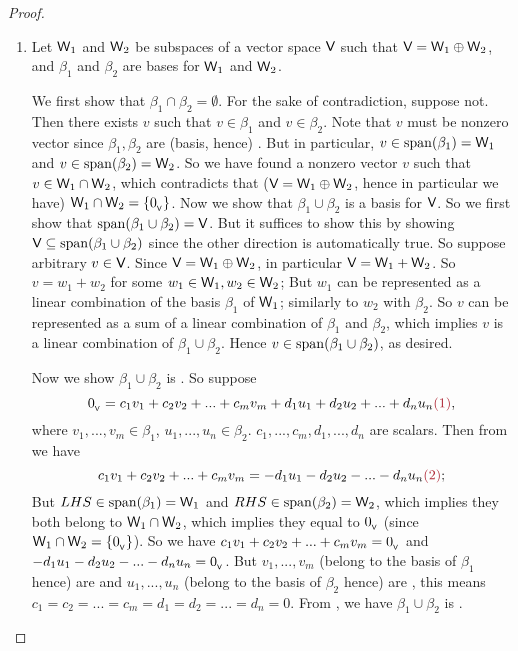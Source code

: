 \begin{proof} \ 
\begin{enumerate}
\item
Let \(\textsf{W}_1\) and \(\textsf{W}_2\) be subspaces of a vector space \(\textsf{V}\) such that \(\textsf{V} = \textsf{W}_1 \oplus \textsf{W}_2\), and \(\beta_1\) and \(\beta_2\) are bases for \(\textsf{W}_1\) and \(\textsf{W}_2\).

We first show that \(\beta_1 \cap \beta_2 = \emptyset\).
For the sake of contradiction, suppose not.
Then there exists \(v\) such that \(v \in \beta_1\) and \(v \in \beta_2\).
Note that \(v\) must be nonzero vector since \(\beta_1, \beta_2\) are (basis, hence) \LID{}.
But in particular, \(v \in \operatorname{span}(\beta_1) = \textsf{W}_1\) and \(v \in \operatorname{span}(\beta_2) = \textsf{W}_2\).
So we have found a nonzero vector \(v\) such that \(v \in \textsf{W}_1 \cap \textsf{W}_2\), which contradicts that (\(\textsf{V} = \textsf{W}_1 \oplus \textsf{W}_2\), hence in particular we have) \(\textsf{W}_1 \cap \textsf{W}_2 = \{ 0_{_{\textsf{V}}} \}\).
Now we show that \(\beta_1 \cup \beta_2\) is a basis for \(\textsf{V}\).
So we first show that \(\operatorname{span}(\beta_1 \cup \beta_2) = \textsf{V}\).
But it suffices to show this by showing \(\textsf{V} \subseteq \operatorname{span}(\beta_1 \cup \beta_2)\) since the other direction is automatically true.
So suppose arbitrary \(v \in \textsf{V}\).
Since \(\textsf{V} = \textsf{W}_1 \oplus \textsf{W}_2\), in particular \(\textsf{V} = \textsf{W}_1 + \textsf{W}_2\).
So \(v = w_1 + w_2\) for some \(w_1 \in \textsf{W}_1, w_2 \in \textsf{W}_2\);
But \(w_1\) can be represented as a linear combination of the basis \(\beta_1\) of \(\textsf{W}_1\); similarly to \(w_2\) with \(\beta_2\).
So \(v\) can be represented as a sum of a linear combination of \(\beta_1\) and \(\beta_2\), which implies \(v\) is a linear combination of \(\beta_1 \cup \beta_2\).
Hence \(v \in \operatorname{span}(\beta_1 \cup \beta_2)\), as desired.

Now we show \(\beta_1 \cup \beta_2\) is \LID{}.
So suppose
\[
    \OV = c_1 v_1 + c_2 v_2 + ... + c_m v_m + d_1 u_1 + d_2 u_2 + ... + d_n u_n ,
\]
where \(v_1, ..., v_m \in \beta_1\), \(u_1, ..., u_n \in \beta_2\). \(c_1, ..., c_m, d_1, ..., d_n\) are scalars.
Then from \MAROON{(1)} we have
\[
    c_1 v_1 + c_2 v_2 + ... + c_m v_m = - d_1 u_1 - d_2 u_2 - ... - d_n u_n \MAROON{(2)};
\]
But \(LHS \in \operatorname{span}(\beta_1) = \textsf{W}_1\) and \(RHS \in \operatorname{span}(\beta_2) = \textsf{W}_2\), which implies they both belong to \(\textsf{W}_1 \cap \textsf{W}_2\), which implies they equal to \(0_{_{\textsf{V}}}\) (since \(\textsf{W}_1 \cap \textsf{W}_2 = \{ 0_{_{\textsf{V}}} \}\)).
So we have \(c_1 v_1 + c_2 v_2 + ... + c_m v_m = 0_{_{\textsf{V}}}\) and \(- d_1 u_1 - d_2 u_2 - ... - d_n u_n = 0_{_{\textsf{V}}}\).
But \(v_1, ..., v_m\) (belong to the basis of \(\beta_1\) hence) are \LID{} and \(u_1, ..., u_n\) (belong to the basis of \(\beta_2\) hence) are \LID{}, this means \(c_1 = c_2 = ... = c_m = d_1 = d_2 = ... = d_n = 0\).
From \MAROON{(1)}, we have \(\beta_1 \cup \beta_2\) is \LID{}.


\end{enumerate}
\end{proof}
